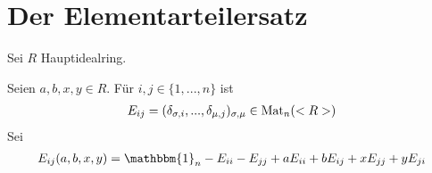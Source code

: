 \section{Der Elementarteilersatz}

Sei $R$ Hauptidealring.

\begin{definition}
	Seien $a,b,x,y\in R$. Für $i,j\in\{1,...,n\}$ ist
	\begin{align}
		E_{ij} = (\delta_{\sigma,i},...,\delta_{\mu,j})_{\sigma,\mu}\in\operatorname{Mat}_n(<R>)\notag
	\end{align}
	Sei
	\begin{align}
		E_{ij}(a,b,x,y) = \mathbbm{1}_n-E_{ii}-E_{jj}+aE_{ii}+bE_{ij}+xE_{jj}+yE_{ji}\notag
	\end{align}
\end{definition}

